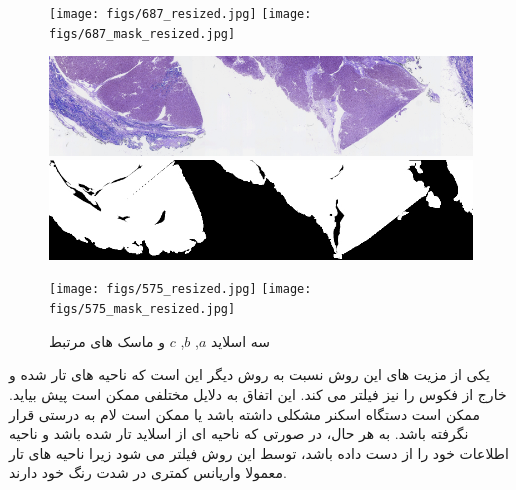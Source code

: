 \begin{figure}
    \begin{center}

        \texttt{[image: figs/687\_resized.jpg]}
        \texttt{[image: figs/687\_mask\_resized.jpg]}
        \hspace{.5cm}

        \includegraphics[width=0.48\linewidth]{figs/1066_cropped_resized.jpg}
        \includegraphics[width=0.48\linewidth]{figs/1066_cropped_masked_resized.jpg}
        \hspace{.5cm}

        \texttt{[image: figs/575\_resized.jpg]}
        \texttt{[image: figs/575\_mask\_resized.jpg]}


    \end{center}
    \caption{سه اسلاید $a$, $b$, $c$ و ماسک های مرتبط}
    \label{شکل: سه اسلاید و ماسک های مرتبط}
\end{figure}

یکی از مزیت های این روش نسبت به روش دیگر این است که ناحیه های تار شده و خارج از فکوس را نیز فیلتر می کند.
این اتفاق به دلایل مختلفی ممکن است پیش بیاید.
ممکن است دستگاه اسکنر مشکلی داشته باشد یا ممکن است لام به درستی قرار نگرفته باشد.
به هر حال، در صورتی که ناحیه ای از اسلاید تار شده باشد و ناحیه اطلاعات خود را از دست داده باشد،
توسط این روش فیلتر می شود زیرا ناحیه های تار معمولا واریانس کمتری در شدت رنگ خود دارند.

